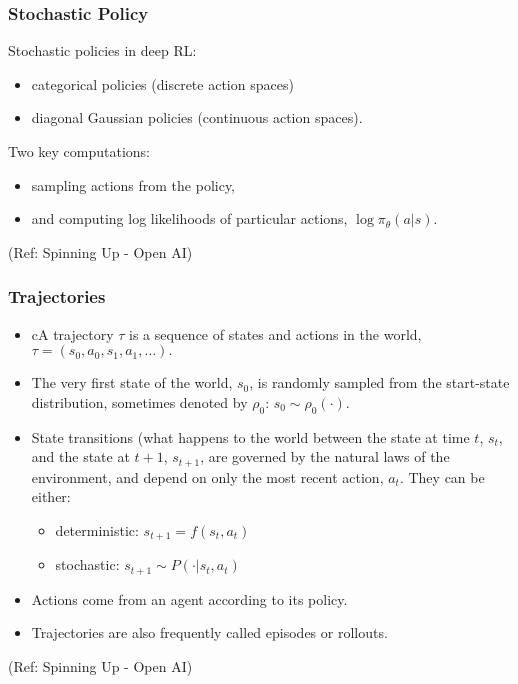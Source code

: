 \begin{frame}[fragile]\frametitle{Stochastic  Policy}

Stochastic policies in deep RL: 
\begin{itemize}
\item categorical policies (discrete action spaces) 
\item diagonal Gaussian policies (continuous action spaces).
\end{itemize}

Two key computations:
\begin{itemize}
\item sampling actions from the policy,
\item and computing log likelihoods of particular actions, $\log \pi_{\theta}(a|s)$.
\end{itemize}

{\tiny (Ref: Spinning Up - Open AI)}
\end{frame}

\begin{frame}[fragile]\frametitle{Trajectories}

\begin{itemize}
\item cA trajectory $\tau$ is a sequence of states and actions in the world, $\tau = (s_0, a_0, s_1, a_1, ...).$
\item The very first state of the world, $s_0$, is randomly sampled from the start-state distribution, sometimes denoted by $\rho_0$:
$s_0 \sim \rho_0(\cdot)$.
\item State transitions (what happens to the world between the state at time $t$, $s_t$, and the state at $t+1$, $s_{t+1}$, are governed by the natural laws of the environment, and depend on only the most recent action, $a_t$. They can be either:
\begin{itemize}
\item deterministic: $s_{t+1} = f(s_t, a_t)$
\item stochastic: $s_{t+1} \sim P(\cdot|s_t, a_t)$
\end{itemize}
\item Actions come from an agent according to its policy.
\item Trajectories are also frequently called episodes or rollouts.
\end{itemize}

{\tiny (Ref: Spinning Up - Open AI)}
\end{frame}

